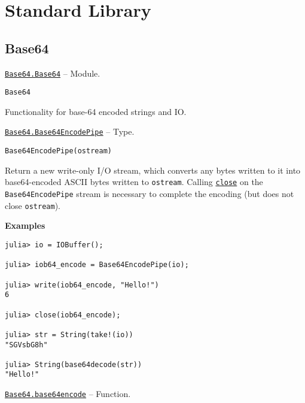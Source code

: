 
\part{Standard Library}


\hypertarget{11756231791819393325}{}


\chapter{Base64}


\hypertarget{6529833673026929543}{} 
\hyperlink{6529833673026929543}{\texttt{Base64.Base64}}  -- {Module.}

\begin{adjustwidth}{2em}{0pt}


\begin{verbatim}
Base64
\end{verbatim}

Functionality for base-64 encoded strings and IO.



\end{adjustwidth}
\hypertarget{3718432815614240925}{} 
\hyperlink{3718432815614240925}{\texttt{Base64.Base64EncodePipe}}  -- {Type.}

\begin{adjustwidth}{2em}{0pt}


\begin{verbatim}
Base64EncodePipe(ostream)
\end{verbatim}

Return a new write-only I/O stream, which converts any bytes written to it into base64-encoded ASCII bytes written to \texttt{ostream}.  Calling \hyperlink{5331333469799487255}{\texttt{close}} on the \texttt{Base64EncodePipe} stream is necessary to complete the encoding (but does not close \texttt{ostream}).

\textbf{Examples}


\begin{verbatim}
julia> io = IOBuffer();

julia> iob64_encode = Base64EncodePipe(io);

julia> write(iob64_encode, "Hello!")
6

julia> close(iob64_encode);

julia> str = String(take!(io))
"SGVsbG8h"

julia> String(base64decode(str))
"Hello!"
\end{verbatim}



\end{adjustwidth}
\hypertarget{1446212874874362397}{} 
\hyperlink{1446212874874362397}{\texttt{Base64.base64encode}}  -- {Function.}

